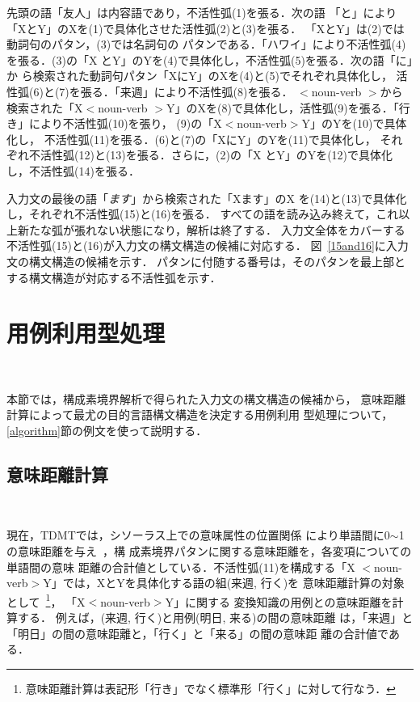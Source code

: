 先頭の語「友人」は内容語であり，不活性弧(1)を張る．次の語
「と」により「XとY」のXを(1)で具体化させた活性弧(2)と(3)を張る．
「XとY」は(2)では動詞句のパタン，(3)では名詞句の
パタンである．「ハワイ」により不活性弧(4)を張る．(3)の「X
とY」のYを(4)で具体化し，不活性弧(5)を張る．次の語「に」か
ら検索された動詞句パタン「XにY」のXを(4)と(5)でそれぞれ具体化し，
活性弧(6)と(7)を張る．「来週」により不活性弧(8)を張る．
\clearpage
\noindent
{\footnotesize $<$}noun-verb{\footnotesize
 $>$}から検索された「X{\footnotesize $<$}noun-verb{\footnotesize
 $>$}Y」のXを(8)で具体化し，活性弧(9)を張る．「行き」により不活性弧(10)を張り，
(9)の「X{\footnotesize $<$}noun-verb{\footnotesize $>$}Y」のYを(10)で具体化し，
不活性弧(11)を張る．(6)と(7)の「XにY」のYを(11)で具体化し，
それぞれ不活性弧(12)と(13)を張る．さらに，(2)の「X
とY」のYを(12)で具体化し，不活性弧(14)を張る．

入力文の最後の語「{\it ます}」から検索された「Xます」のX
を(14)と(13)で具体化し，それぞれ不活性弧(15)と(16)を張る．
すべての語を読み込み終えて，これ以上新たな弧が張れない状態になり，解析は終了する．
入力文全体をカバーする不活性弧(15)と(16)が入力文の構文構造の候補に対応する．
図~\ref{15and16}に入力文の構文構造の候補を示す．
パタンに付随する番号は，そのパタンを最上部とする構文構造が対応する不活性弧を示す．

\begin{figure*}[htb]
\begin{center}
\caption{入力文の構文構造の候補}
\label{15and16}
\end{center}
\end{figure*}

\section{用例利用型処理}~\label{ebmt}

本節では，構成素境界解析で得られた入力文の構文構造の候補から，
意味距離計算によって最尤の目的言語構文構造を決定する用例利用
型処理について，
\ref{algorithm}節の例文を使って説明する．

\subsection{意味距離計算}~\label{dis-input}

現在，TDMTでは，シソーラス上での意味属性の位置関係
により単語間に0$\sim$1の意味距離を与え~\cite{Sumita}，構
成素境界パタンに関する意味距離を，各変項についての単語間の意味
距離の合計値としている．不活性弧(11)を構成する「X{\footnotesize
$<$}noun-verb{\footnotesize $>$}Y」では，XとYを具体化する語の組(来週, 行く)を
意味距離計算の対象として~\footnote{
意味距離計算は表記形「行き」でなく標準形「行く」に対して行なう．}，
「X{\footnotesize $<$}noun-verb{\footnotesize $>$}Y」に関する
変換知識の用例との意味距離を計算する．
例えば，(来週, 行く)と用例(明日, 来る)の間の意味距離
は，「来週」と「明日」の間の意味距離と，「行く」と「来る」の間の意味距
離の合計値である．

